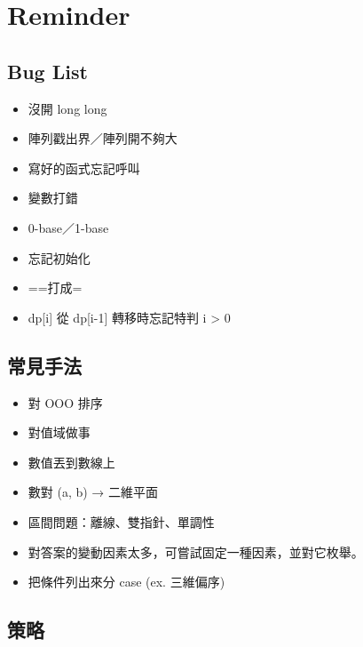 \documentclass[twocolumn]{article}
\begin{document}
\setlength\parindent{0pt}

\tableofcontents

\pagestyle{fancy}
\fancyfoot{}
\fancyhead[R]{\thepage}

\newpage

\section{Reminder}

\subsection{Bug List}

\begin{itemize}
    \item 沒開 long long
    \item 陣列戳出界／陣列開不夠大
    \item 寫好的函式忘記呼叫
    \item 變數打錯
    \item 0-base／1-base
    \item 忘記初始化
    \item ==打成=
    \item dp[i] 從 dp[i-1] 轉移時忘記特判 i > 0
\end{itemize}

\subsection{常見手法}

\begin{itemize}
    \item 對 OOO 排序
    \item 對值域做事
    \item 數值丟到數線上
    \item 數對 (a, b) → 二維平面
    \item 區間問題：離線、雙指針、單調性
    \item 對答案的變動因素太多，可嘗試固定一種因素，並對它枚舉。
    \item 把條件列出來分 case (ex. 三維偏序)
\end{itemize}

\subsection{策略}
\end{document}
